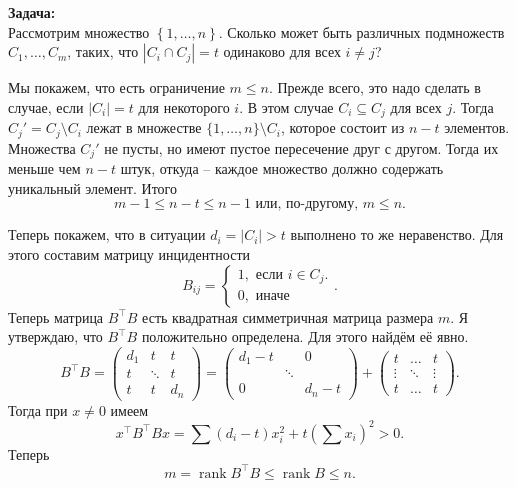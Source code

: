\documentclass[10pt,a4paper,oneside]{book}
\theoremstyle{definition}
\newcommand{\rank}{\operatorname{rank}}
\def\pmat{\begin{pmatrix}}
\def\epmat{\end{pmatrix}}
\begin{document}
{\bf Задача:}\\ Рассмотрим множество $\left\{ 1,\dots, n\right\}$. Сколько может быть различных подмножеств $C_1,\dots,C_m$, таких, что $|C_i \cap C_j|=t$ одинаково для всех $i \neq j$?

Мы покажем, что есть ограничение $m\leq n$. Прежде всего, это надо сделать в случае, если $|C_i|=t$ для некоторого $i$. В этом случае $C_i \subseteq C_j$ для всех $j$. Тогда $C_j'=C_j\setminus C_i$ лежат в множестве $\{1,\dots,n\}\setminus C_i$, которое состоит из $n-t$ элементов. Множества $C_j'$ не пусты, но имеют пустое пересечение друг с другом. Тогда их меньше чем $n-t$ штук, откуда -- каждое множество должно содержать уникальный элемент. Итого
$$m-1\leq n-t \leq n-1 \text{ или, по-другому, } m \leq n.$$

Теперь покажем, что в ситуации $d_i=|C_i|>t$ выполнено то же неравенство. Для этого составим матрицу инцидентности
$$B_{ij}= \begin{cases} 1, \text{ если } i\in C_j. \\
0, \text{ иначе}
\end{cases}. $$
Теперь матрица $B^{\top}B$ есть квадратная симметричная матрица размера $m$. Я утверждаю, что $B^{\top}B$ положительно определена. Для этого найдём её явно.
$$B^{\top}B= \pmat
d_1 & t &t\\ 
t & \ddots & t \\
t & t & d_n
\epmat = \pmat
d_1-t &  &0\\ 
 & \ddots &  \\
0 &  & d_n-t
\epmat + \pmat
t & \dots & t\\ 
\vdots & \ddots & \vdots \\
t & \dots & t
\epmat.$$
Тогда при $x\neq 0$ имеем 
$$x^{\top} B^{\top}B x = \sum (d_i-t) x_i^2 + t(\sum x_i)^2>0.$$
Теперь 
$$m=\rank B^{\top}B \leq \rank B \leq n.$$ 
\end{document}
